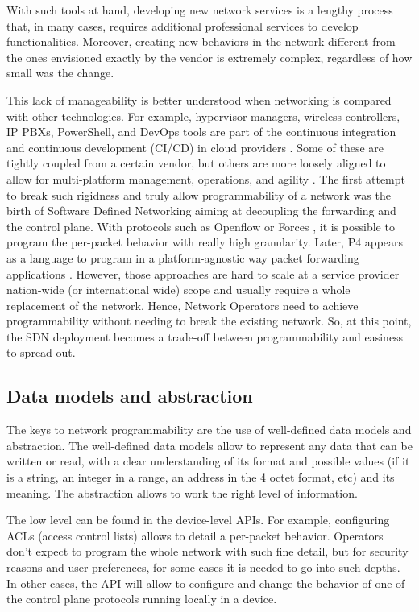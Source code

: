 \documentclass[a4paper,fleqn]{cas-dc}
\begin{document}
With such tools at hand, developing new network services is a lengthy process that, in many cases, requires additional professional services to develop functionalities. Moreover, creating new behaviors in the network different from the ones envisioned exactly by the vendor is extremely complex, regardless of how small was the change.

This lack of manageability is better understood when networking is compared with other technologies. For example, hypervisor managers, wireless controllers, IP PBXs, PowerShell, and DevOps tools are part of the continuous integration and continuous development (CI/CD) in cloud providers \cite{mittal2017cloud,demchenko2016zerotouch}. Some of these are tightly coupled from a certain vendor, but others are more loosely aligned to allow for multi-platform management, operations, and agility \cite{edelman2018network}.
The first attempt to break such rigidness and truly allow programmability of a network was the birth of Software Defined Networking aiming at decoupling the forwarding and the control plane. With protocols such as Openflow \cite{mckeown2008openflow} or Forces \cite{doria2010forwarding}, it is possible to program the per-packet behavior with really high granularity. Later, P4 appears as a language to program in a platform-agnostic way packet forwarding applications \cite{bosshart2014p4}. However, those approaches are hard to scale at a service provider nation-wide (or international wide) scope and usually require a whole replacement of the network. Hence, Network Operators need to achieve programmability without needing to break the existing network. So, at this point, the SDN deployment becomes a trade-off between programmability and easiness to spread out. 

\subsection{Data models and abstraction}

The keys to network programmability are the use of well-defined data models and abstraction. The well-defined data models allow to represent any data that can be written or read, with a clear understanding of its format and possible values (if it is a string, an integer in a range, an address in the 4 octet format, etc) and its meaning.  The abstraction allows to work the right level of information. 

The low level can be found in the device-level APIs. For example, configuring ACLs (access control lists) allows to detail a per-packet behavior. Operators don’t expect to program the whole network with such fine detail, but for security reasons and user preferences, for some cases it is needed to go into such depths. In other cases, the API will allow to configure and change the behavior of one of the control plane protocols running locally in a device.
\end{document}

